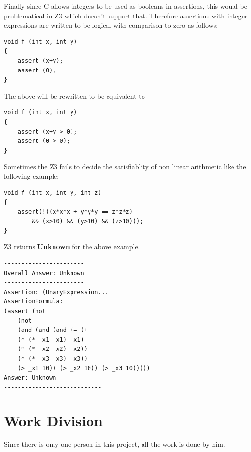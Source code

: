 \documentclass[12pt,a4paper]{article}
\begin{document}
Finally since C allows integers to be used as booleans in assertions, this would be problematical in Z3 which doesn't support that. Therefore assertions with integer expressions are written to be logical with comparison to zero as follows:

\begin{lstlisting}  
void f (int x, int y) 
{ 	
	assert (x+y);
	assert (0);
}
\end{lstlisting}

The above will be rewritten to be equivalent to 
\begin{lstlisting}  
void f (int x, int y) 
{ 	
	assert (x+y > 0);
	assert (0 > 0);
}
\end{lstlisting}


Sometimes the Z3 fails to decide the satisfiablity  of non linear arithmetic like the following example:

\begin{lstlisting}  
void f (int x, int y, int z)
{
	assert(!((x*x*x + y*y*y == z*z*z) 
		&& (x>10) && (y>10) && (z>10)));
}
\end{lstlisting}

Z3 returns \textbf{Unknown} for the above example.


\begin{lstlisting}
-----------------------
Overall Answer: Unknown
-----------------------
Assertion: (UnaryExpression...
AssertionFormula: 
(assert (not
	(not 
	(and (and (and (= (+ 
	(* (* _x1 _x1) _x1) 
	(* (* _x2 _x2) _x2)) 
	(* (* _x3 _x3) _x3)) 
	(> _x1 10)) (> _x2 10)) (> _x3 10)))))
Answer: Unknown
----------------------------
\end{lstlisting}

\section{Work Division} 

Since there is only one person in this project, all the work is done by him. 




\end{document}
